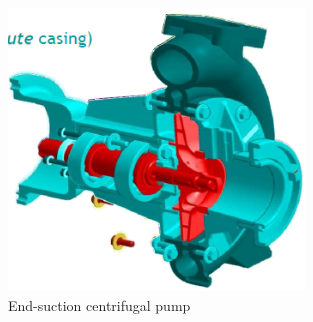 \documentclass[class=report, crop=false, 12pt,a4paper]{standalone}
\begin{document}
\begin{figure}[H]
  \centering
  \includegraphics[width = 0.7\textwidth]{../img/diagram4.png}
  \caption{End-suction centrifugal pump}
\end{figure}
\end{document}
